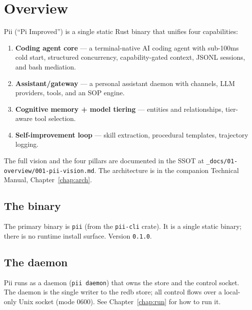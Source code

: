 \documentclass[
	fontsize=10pt,
	twoside=false,
	secnumdepth=2,
	open=any,
]{kaobook}
\begin{document}
\begingroup
\setlength{\textheight}{230\vscale}
\etocstandarddisplaystyle
\etocstandardlines
\tableofcontents
\endgroup

\mainmatter
{}

\chapter{Overview}
\label{chap:overview}

Pii (``Pi Improved'') is a single static Rust binary that unifies four
capabilities:

\begin{enumerate}
    \item \textbf{Coding agent core} — a terminal-native AI coding agent
        with sub-100ms cold start, structured concurrency, capability-gated
        context, JSONL sessions, and bash mediation.
    \item \textbf{Assistant/gateway} — a personal assistant daemon with
        channels, LLM providers, tools, and an SOP engine.
    \item \textbf{Cognitive memory + model tiering} — entities and
        relationships, tier-aware tool selection.
    \item \textbf{Self-improvement loop} — skill extraction, procedural
        templates, trajectory logging.
\end{enumerate}

The full vision and the four pillars are documented in the SSOT at
\texttt{\_docs/01-overview/001-pii-vision.md}. The architecture is in the
companion Technical Manual, Chapter~\ref{chap:arch}.

\section{The binary}

The primary binary is \texttt{pii} (from the \texttt{pii-cli} crate). It
is a single static binary; there is no runtime install surface. Version
\texttt{0.1.0}.

\section{The daemon}

Pii runs as a daemon (\texttt{pii daemon}) that owns the store and the
control socket. The daemon is the single writer to the redb store; all
control flows over a local-only Unix socket (mode 0600). See
Chapter~\ref{chap:run} for how to run it.
\end{document}
